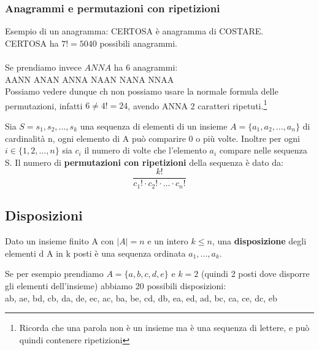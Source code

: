 \subsubsection{Anagrammi e permutazioni con ripetizioni}
\begin{example}
Esempio di un anagramma: CERTOSA è anagramma di COSTARE. \\
CERTOSA ha $7! = 5040$ possibili anagrammi.\\\\
Se prendiamo invece $ANNA$ ha 6 anagrammi:\\
AANN \hspace{.5cm} ANAN \hspace{.5cm} ANNA \hspace{.5cm} NAAN \hspace{.5cm} NANA \hspace{.5cm} NNAA\\
Possiamo vedere dunque ch non possiamo usare la normale formula delle permutazioni, infatti $6 \neq 4! = 24$, avendo ANNA 2 caratteri ripetuti.\footnote{Ricorda che una parola non è un insieme ma è una sequenza di lettere, e può quindi contenere ripetizioni}
\end{example}

\begin{proposition}
Sia $S = s_1, s_2, ..., s_k$ una sequenza di elementi di un insieme $A = \{a_1, a_2, ..., a_n\}$ di cardinalità n, ogni elemento di A può comparire 0 o più volte. Inoltre per ogni $i \in \{1,2,..., n\}$ sia $c_i$ il numero di volte che l'elemento $a_i$ compare nelle sequenza S. Il numero di \textbf{permutazioni con ripetizioni} della sequenza è dato da:
\begin{equation}
    \frac{\displaystyle k!}{\displaystyle c_1! \cdot c_2! \cdot ... \cdot c_n!}
\end{equation}
\end{proposition}

\subsection{Disposizioni}
\begin{definition}[Disposizioni]
    Dato un insieme finito A con $|A| = n$ e un intero $k \leq n$, una \textbf{disposizione} degli elementi d A in k posti è una sequenza ordinata $a_1, ..., a_k$.
\end{definition}

\begin{example}
Se per esempio prendiamo $A = \{a,b,c,d,e\}$ e $k = 2$ (quindi 2 posti dove disporre gli elementi dell'insieme) abbiamo 20 possibili disposizioni:\\
ab, ae, bd, cb, da, de, ec, ac, ba, be, cd, db, ea, ed, ad, bc, ca, ce, dc, eb
\end{example}

